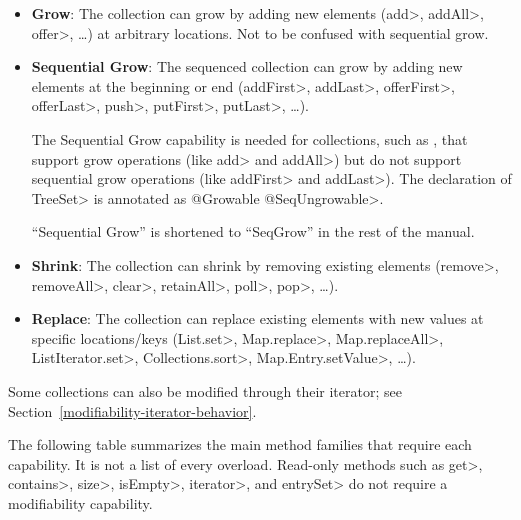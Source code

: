 \begin{itemize}
    \item \textbf{Grow}: The collection can grow by adding new elements
      (\<add>, \<addAll>, \<offer>, \ldots) at arbitrary locations.
       Not to be confused with sequential grow.
    \item \textbf{Sequential Grow}: The sequenced collection can grow by adding new
      elements at the beginning or end (\<addFirst>, \<addLast>,
      \<offerFirst>, \<offerLast>, \<push>, \<putFirst>,
      \<putLast>, \ldots).

      The Sequential Grow capability is needed for collections, such as
      , that
      support grow operations (like \<add> and \<addAll>) but do not
      support sequential grow operations (like \<addFirst> and
      \<addLast>).  The declaration of \<TreeSet> is annotated as \<@Growable @SeqUngrowable>.

      ``Sequential Grow'' is shortened to ``SeqGrow'' in the rest of the manual.
    \item \textbf{Shrink}: The collection can shrink by removing
      existing elements (\<remove>, \<removeAll>, \<clear>, \<retainAll>, \<poll>, \<pop>, \ldots).
    \item \textbf{Replace}: The collection can replace existing
      elements with new values at specific locations/keys (\<List.set>, \<Map.replace>, \<Map.replaceAll>,
       \<ListIterator.set>,  \<Collections.sort>, \<Map.Entry.setValue>, \ldots).
\end{itemize}

\noindent
Some collections can also be modified through their iterator; see Section~\ref{modifiability-iterator-behavior}.

The following table summarizes the main method families that require
each capability.  It is not a list of every overload.  Read-only
methods such as \<get>, \<contains>, \<size>, \<isEmpty>, \<iterator>, and
\<entrySet> do not require a modifiability capability.

